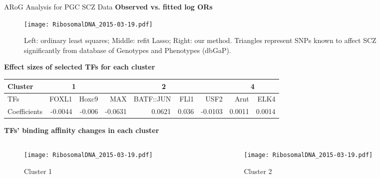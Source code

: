 \documentclass[final]{beamer}
\newcommand{\ei}{\end{itemize}}
\begin{document}
\begin{frame}{}
\begin{columns}[t]
\begin{column}{1\linewidth}
\begin{columns}
\begin{column}{.33\textwidth}

\begin{block}{ARoG Analysis for PGC SCZ Data} %
{\color{orange!100} \textbf{Observed vs. fitted log ORs}}                                                 
\centering

\begin{figure}[p]
  \centering
  \texttt{[image: RibosomalDNA\_2015-03-19.pdf]}
  \caption{Left: ordinary least squares; Middle: refit Lasso; Right: our method. Triangles represent SNPs known to affect SCZ significantly from database of Genotypes and Phenotypes (dbGaP).}
\end{figure}
 
{\color{orange!100} \textbf{Effect sizes of selected TFs for each cluster}}
 \begin{table}
{\small
 \begin{tabular}{l|rr|rrrr|rr}
 \hline
Cluster &  \multicolumn{2}{c|}{1} & \multicolumn{4}{c|}{2}& \multicolumn{2}{c}{4}\\
 \hline
TFs &FOXL1 &  Hoxc9 & MAX & BATF::JUN & FLl1 & USF2 & Arnt & ELK4\\
 \hline
Coefficients & -0.0044 & -0.006 & -0.0631 & 0.0621 & 0.036 & -0.0103 & 0.0011 & 0.0014\\
 \hline
\end{tabular}
}
\end{table}

 {\color{orange!100} \textbf{TFs' binding affinity changes in each cluster}}
\begin{columns}
\begin{column}{.32\textwidth}                                                      
\begin{figure}[p]
\centering
 \texttt{[image: RibosomalDNA\_2015-03-19.pdf]}
 \caption{{\small Cluster 1}}
\end{figure}
\end{column}

\begin{column}{.32\textwidth}                                                      
\begin{figure}[p]
  \centering
  \texttt{[image: RibosomalDNA\_2015-03-19.pdf]}
 \caption{{\small Cluster 2}}
\end{figure}
\end{column}


\end{columns}
\end{block}
\end{column}
\end{columns}
\end{column}
\end{columns}
\end{frame}
\end{document}
